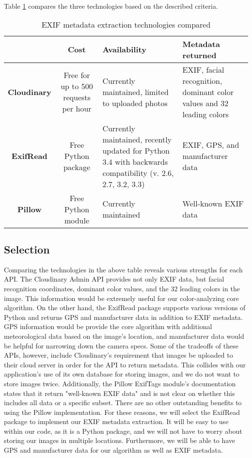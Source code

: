 \documentclass[letterpaper,10pt,draftclsnofoot,onecolumn]{IEEEtran}
\begin{document}
\begin{flushleft}
\medskip

Table \ref{table:2} compares the three technologies based on the described criteria. \cite{22} \cite{23} \cite{24}
\begin{table}[h!]
\caption{EXIF metadata extraction technologies compared}\label{table:2}
\centering
	\begin{tabular}{| c | c |  p{5cm}  |  p{5cm}  |} 
		\hline
		 & Cost & Availability & Metadata returned\\ [0.5ex] 
		\hline
		\textbf{Cloudinary} & Free for up to 500 requests per hour & Currently maintained, limited to uploaded photos & EXIF, facial recognition, dominant color values and 32 leading colors \\ 
		\hline
		\textbf{ExifRead} & Free Python package & Currently maintained, recently updated for Python 3.4 with backwards compatibility (v. 2.6, 2.7, 3.2, 3.3) & EXIF, GPS, and manufacturer data \\
		\hline
		\textbf{Pillow} & Free Python module & Currently maintained & Well-known EXIF data \\
		\hline
	\end{tabular}
\end{table}
\subsection{Selection}
Comparing the technologies in the above table reveals various strengths for each API. The Cloudinary Admin API provides not only EXIF data, but facial recognition coordinates, dominant color values, and the 32 leading colors in the image. \cite{22} This information would be extremely useful for our color-analyzing core algorithm. On the other hand, the ExifRead package supports various versions of Python and returns GPS and manufacturer data in addition to EXIF metadata. \cite{23} GPS information would be provide the core algorithm with additional meteorological data based on the image's location, and manufacturer data would be helpful for narrowing down the camera specs. Some of the tradeoffs of these APIs, however, include Cloudinary's requirement that images be uploaded to their cloud server in order for the API to return metadata. This collides with our application's use of its own database for storing images, and we do not want to store images twice. Additionally, the Pillow ExifTags module's documentation states that it return "well-known EXIF data" and is not clear on whether this includes all data or a specific subset. \cite{24} There are no other outstanding benefits to using the Pillow implementation. For these reasons, we will select the ExifRead package to implement our EXIF metadata extraction. It will be easy to use within our code, as it is a Python package, and we will not have to worry about storing our images in multiple locations. Furthermore, we will be able to have GPS and manufacturer data for our algorithm as well as EXIF metadata.





\end{flushleft}
\end{document}
